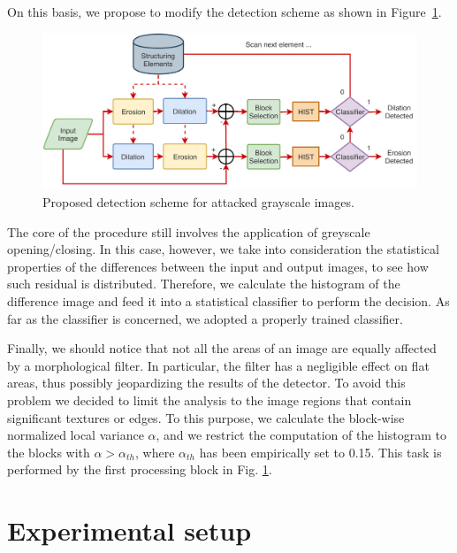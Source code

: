 \documentclass[review]{elsarticle}
\begin{document}
On this basis, we propose to modify the detection scheme as shown in Figure~\ref{fig:scheme_improved}.

\begin{figure}[!ht]
	\centering
	\includegraphics[width=\linewidth]{diagram2}
	\caption{Proposed detection scheme for attacked grayscale images.} 
	\label{fig:scheme_improved}
\end{figure}

The core of the procedure still involves the application of greyscale opening/closing. In this case, however, we take into consideration the statistical properties of the differences between the input and output images, to see how such residual is distributed. Therefore, we calculate the histogram of the difference image and feed it into a statistical classifier to perform the decision. As far as the classifier is concerned, we adopted a properly trained classifier. %

Finally, we should notice that not all the areas of an image are equally affected by a morphological filter. In particular, the filter has a negligible effect on flat areas, thus possibly jeopardizing the results of the detector. To avoid this problem we decided to limit the analysis to the image regions that contain significant textures or edges. To this purpose, we calculate the block-wise normalized local variance $\alpha$, and we restrict the computation of the histogram to the blocks with $\alpha > \alpha_{th}$, where $\alpha_{th}$ has been empirically set to 0.15. This task is performed by the first processing block in Fig. \ref{fig:scheme_improved}. 


\section{Experimental setup}
\label{sec:exp_setup}
\end{document}
